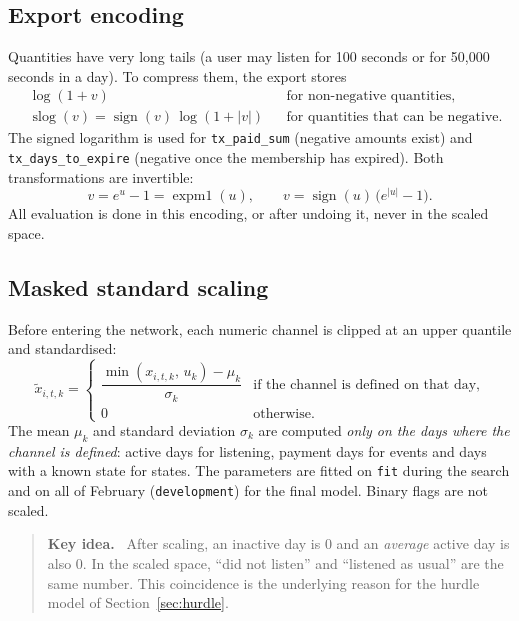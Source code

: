 \documentclass[11pt]{article}
\newcommand{\slog}{\operatorname{slog}}
\newcommand{\code}[1]{\texttt{#1}}
\newenvironment{idea}{\begin{quote}\small\color{black!75}\textbf{Key idea.}~}{\end{quote}}
\begin{document}
\subsection{Export encoding}

Quantities have very long tails (a user may listen for 100 seconds or for 50{,}000 seconds in a day). To compress them, the export stores
\begin{align}
&\log(1 + v) && \text{for non-negative quantities}, \\
&\slog(v) = \operatorname{sign}(v)\,\log(1 + |v|) && \text{for quantities that can be negative}.
\end{align}
The signed logarithm is used for \code{tx\_paid\_sum} (negative amounts exist) and \code{tx\_days\_to\_expire} (negative once the membership has expired). Both transformations are invertible:
\begin{equation}
v = e^{u} - 1 = \operatorname{expm1}(u), \qquad v = \operatorname{sign}(u)\,\big(e^{|u|} - 1\big).
\end{equation}
All evaluation is done in this encoding, or after undoing it, never in the scaled space.

\subsection{Masked standard scaling}

Before entering the network, each numeric channel is clipped at an upper quantile and standardised:
\begin{equation}
\tilde x_{i,t,k} =
\begin{cases}
\dfrac{\min(x_{i,t,k},\, u_k) - \mu_k}{\sigma_k} & \text{if the channel is defined on that day,} \\[0.8em]
0 & \text{otherwise.}
\end{cases}
\end{equation}
The mean $\mu_k$ and standard deviation $\sigma_k$ are computed \emph{only on the days where the channel is defined}: active days for listening, payment days for events and days with a known state for states. The parameters are fitted on \code{fit} during the search and on all of February (\code{development}) for the final model. Binary flags are not scaled.

\begin{idea}
After scaling, an inactive day is 0 and an \emph{average} active day is also 0. In the scaled space, ``did not listen'' and ``listened as usual'' are the same number. This coincidence is the underlying reason for the hurdle model of Section~\ref{sec:hurdle}.
\end{idea}
\end{document}
